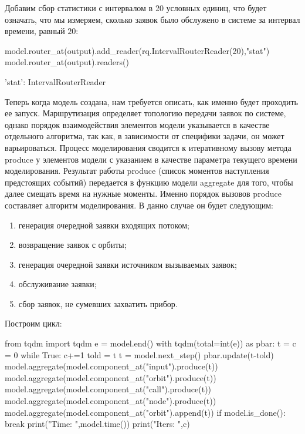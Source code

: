 Добавим сбор статистики с интервалом в 20 условных единиц, что будет означать, что мы измеряем, сколько заявок было обслужено в системе за интервал времени, равный $20$:

\begin{pyin}
model.router_at(output).add_reader(rq.IntervalRouterReader(20),"stat")
model.router_at(output).readers()
\end{pyin}
\begin{pyout}
'stat': IntervalRouterReader
\end{pyout}

Теперь когда модель создана, нам требуется описать, как именно будет проходить ее запуск. Маршрутизация определяет топологию передачи заявок по системе, однако порядок взаимодействия элементов модели указывается в качестве отдельного алгоритма, так как, в зависимости от специфики задачи, он может варьироваться.
Процесс моделирования сводится к итеративному вызову метода produce у элементов модели с указанием в качестве параметра текущего времени моделирования. Результат работы produce (список моментов наступления предстоящих событий) передается в функцию модели aggregate для того, чтобы далее смещать время на нужные моменты. Именно порядок вызовов produce составляет алгоритм моделирования. В данно случае он будет следующим:
\begin{enumerate}
	\item генерация очередной заявки входящих потоком;
	\item возвращение заявок с орбиты;
	\item генерация очередной заявки источником вызываемых заявок;
	\item обслуживание заявки;
	\item сбор заявок, не сумевших захватить прибор.
\end{enumerate}

Построим цикл:
\begin{pyin}
from tqdm import tqdm
e = model.end()
with tqdm(total=int(e)) as pbar:     
t = c = 0
while True:
    c+=1 
    told = t
    t = model.next_step()
    pbar.update(t-told)
    model.aggregate(model.component_at("input").produce(t))
    model.aggregate(model.component_at("orbit").produce(t))
    model.aggregate(model.component_at("call").produce(t))
    model.aggregate(model.component_at("node").produce(t))
    model.aggregate(model.component_at("orbit").append(t))
    if model.is_done():
        break
print("Time: ",model.time())
print("Iters: ",c)
\end{pyin}

